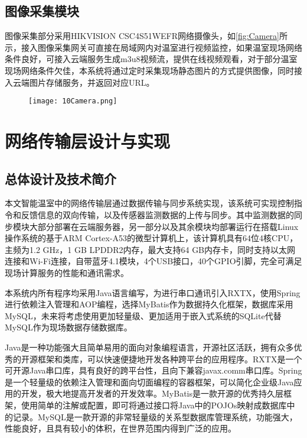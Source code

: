 	\subsection{图像采集模块}
图像采集部分采用HIKVISION CSC4S51WEFR网络摄像头，如\ref{fig:Camera}所示，接入图像采集网关可直接在局域网内对温室进行视频监控，如果温室现场网络条件良好，可接入云端服务生成m3u8视频流，提供在线视频观看，对于部分温室现场网络条件欠佳，本系统将通过定时采集现场静态图片的方式提供图像，同时接入云端图片存储服务，并返回对应URL。
	  	\begin{figure}[!htp]
  			\centering
 			\texttt{[image: 10Camera.png]}
		\end{figure}
\section{网络传输层设计与实现}
	\subsection{总体设计及技术简介}
	本文智能温室中的网络传输层通过数据传输与同步系统实现，该系统可实现控制指令和反馈信息的双向传输，以及传感器监测数据的上传与同步。其中监测数据的同步模块大部分部署在云端服务器，另一部分以及其余模块均部署运行在搭载Linux操作系统的基于ARM Cortex-A53的微型计算机上，该计算机具有64位4核CPU，主频为1.2 GHz，1 GB LPDDR2内存，最大支持64 GB内存卡，同时支持以太网连接和Wi-Fi连接，自带蓝牙4.1模块，4个USB接口，40个GPIO引脚，完全可满足现场计算服务的性能和通讯需求。
	
本系统内所有程序均采用Java语言编写，为进行串口通讯引入RXTX，使用Spring进行依赖注入管理和AOP编程，选择MyBatis作为数据持久化框架，数据库采用MySQL，未来将考虑使用更加轻量级、更加适用于嵌入式系统的SQLite代替MySQL作为现场数据存储数据库。

Java是一种功能强大且简单易用的面向对象编程语言，开源社区活跃，拥有众多优秀的开源框架和类库，可以快速便捷地开发各种跨平台的应用程序。RXTX是一个可开源Java串口库，具有良好的跨平台性，且向下兼容javax.comm串口库。Spring是一个轻量级的依赖注入管理和面向切面编程的容器框架，可以简化企业级Java应用的开发，极大地提高开发者的开发效率。MyBatis是一款开源的优秀持久层框架，使用简单的注解或配置，即可将通过接口将Java中的POJOs映射成数据库中的记录。MySQL是一款开源的非常轻量级的关系型数据库管理系统，功能强大，性能良好，且具有较小的体积，在世界范围内得到广泛的应用。


